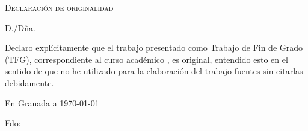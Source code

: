 %

\thispagestyle{empty}

\hfill\vfill

\textsc{Declaración de originalidad}\\\bigskip

D./Dña. \miNombre \\\medskip

Declaro explícitamente que el trabajo presentado como Trabajo de Fin de Grado (TFG), correspondiente al curso académico \miCurso, es original, entendido esto en el sentido de que no he utilizado para la elaboración del trabajo fuentes sin citarlas debidamente.
\medskip

En Granada a \today 
\vspace{3cm}
\begin{center} 
Fdo: \miNombre 

\end{center}

\vfill

\cleardoublepage
\endinput
